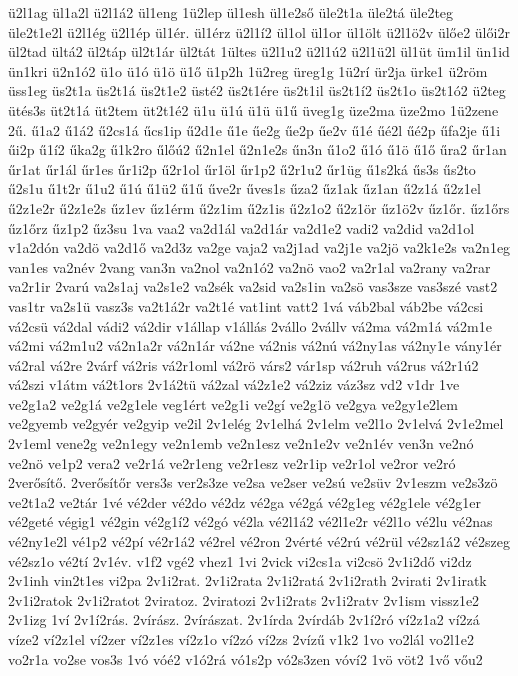 {ü2l1ag
ül1a2l
ü2l1á2
ül1eng
1ü2lep
ül1esh
ül1e2ső
üle2t1a
üle2tá
üle2teg
üle2t1e2l
ü2l1ég
ü2l1ép
ül1ér.
ül1érz
ü2l1í2
ül1ol
ül1or
ül1ölt
ü2l1ö2v
ülőe2
ülői2r
ül2tad
ültá2
ül2táp
ül2t1ár
ül2tát
1ültes
ü2l1u2
ü2l1ú2
ü2l1ü2l
ül1üt
üm1il
ün1id
ün1kri
ü2n1ó2
ü1o
ü1ó
ü1ö
ü1ő
ü1p2h
1ü2reg
üreg1g
1ü2rí
ür2ja
ürke1
ü2röm
üss1eg
üs2t1a
üs2t1á
üs2t1e2
üsté2
üs2t1ére
üs2t1il
üs2t1í2
üs2t1o
üs2t1ó2
ü2teg
ütés3s
üt2t1á
üt2tem
üt2t1é2
ü1u
ü1ú
ü1ü
ü1ű
üveg1g
üze2ma
üze2mo
1ü2zene
2ű.
ű1a2
ű1á2
ű2cs1á
űcs1ip
ű2d1e
ű1e
űe2g
űe2p
űe2v
ű1é
űé2l
űé2p
űfa2je
ű1i
űi2p
ű1í2
űka2g
ű1k2ro
űlőú2
ű2n1el
ű2n1e2s
űn3n
ű1o2
ű1ó
ű1ö
ű1ő
űra2
űr1an
űr1at
űr1ál
űr1es
űr1i2p
ű2r1ol
űr1öl
űr1p2
ű2r1u2
űr1üg
ű1s2ká
űs3s
űs2to
ű2s1u
ű1t2r
ű1u2
ű1ú
ű1ü2
ű1ű
űve2r
űves1s
űza2
űz1ak
űz1an
ű2z1á
ű2z1el
ű2z1e2r
ű2z1e2s
űz1ev
űz1érm
ű2z1im
ű2z1is
ű2z1o2
ű2z1ör
űz1ö2v
űz1őr.
űz1őrs
űz1őrz
űz1p2
űz3su
1va
vaa2
va2d1ál
va2d1ár
va2d1e2
vadi2
va2did
va2d1ol
v1a2dón
va2dö
va2d1ő
va2d3z
va2ge
vaja2
va2j1ad
va2j1e
va2jö
va2k1e2s
va2n1eg
van1es
va2név
2vang
van3n
va2nol
va2n1ó2
va2nö
vao2
va2r1al
va2rany
va2rar
va2r1ir
2varú
va2s1aj
va2s1e2
va2sék
va2sid
va2s1in
va2sö
vas3sze
vas3szé
vast2
vas1tr
va2s1ü
vasz3s
va2t1á2r
va2t1é
vat1int
vatt2
1vá
váb2bal
váb2be
vá2csi
vá2csü
vá2dal
vádi2
vá2dir
v1állap
v1állás
2vállo
2vállv
vá2ma
vá2m1á
vá2m1e
vá2mi
vá2m1u2
vá2n1a2r
vá2n1ár
vá2ne
vá2nis
vá2nú
vá2ny1as
vá2ny1e
vány1ér
vá2ral
vá2re
2várf
vá2ris
vá2r1oml
vá2rö
várs2
vár1sp
vá2ruh
vá2rus
vá2r1ú2
vá2szi
v1átm
vá2t1ors
2v1á2tü
vá2zal
vá2z1e2
vá2ziz
váz3sz
vd2
v1dr
1ve
ve2g1a2
ve2g1á
ve2g1ele
veg1ért
ve2g1i
ve2gí
ve2g1ö
ve2gya
ve2gy1e2lem
ve2gyemb
ve2gyér
ve2gyip
ve2il
2v1elég
2v1elhá
2v1elm
ve2l1o
2v1elvá
2v1e2mel
2v1eml
vene2g
ve2n1egy
ve2n1emb
ve2n1esz
ve2n1e2v
ve2n1év
ven3n
ve2nó
ve2nö
ve1p2
vera2
ve2r1á
ve2r1eng
ve2r1esz
ve2r1ip
ve2r1ol
ve2ror
ve2ró
2verősítő.
2verősítőr
vers3s
ver2s3ze
ve2sa
ve2ser
ve2sú
ve2süv
2v1eszm
ve2s3zö
ve2t1a2
ve2tár
1vé
vé2der
vé2do
vé2dz
vé2ga
vé2gá
vé2g1eg
vé2g1ele
vé2g1er
vé2geté
végig1
vé2gin
vé2g1í2
vé2gó
vé2la
vé2l1á2
vé2l1e2r
vé2l1o
vé2lu
vé2nas
vé2ny1e2l
vé1p2
vé2pí
vé2r1á2
vé2rel
vé2ron
2vérté
vé2rú
vé2rül
vé2sz1á2
vé2szeg
vé2sz1o
vé2tí
2v1év.
v1f2
vgé2
vhez1
1vi
2vick
vi2cs1a
vi2csö
2v1i2dő
vi2dz
2v1inh
vin2t1es
vi2pa
2v1i2rat.
2v1i2rata
2v1i2ratá
2v1i2rath
2virati
2v1iratk
2v1i2ratok
2v1i2ratot
2viratoz.
2viratozi
2v1i2rats
2v1i2ratv
2v1ism
vissz1e2
2v1izg
1ví
2v1í2rás.
2vírász.
2vírászat.
2v1írda
2vírdáb
2v1í2ró
ví2z1a2
ví2zá
víze2
ví2z1el
ví2zer
ví2z1es
ví2z1o
ví2zó
ví2zs
2vízű
v1k2
1vo
vo2lál
vo2l1e2
vo2r1a
vo2se
vos3s
1vó
vóé2
v1ó2rá
vó1s2p
vó2s3zen
vóví2
1vö
vöt2
1vő
vőu2
}
